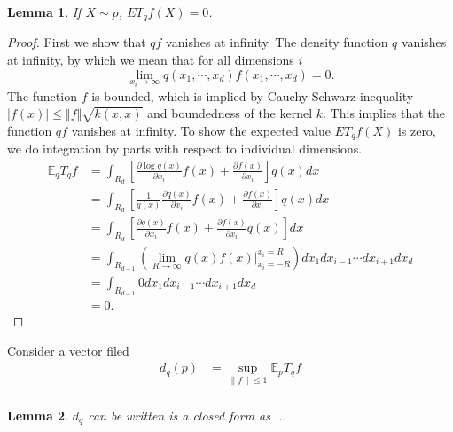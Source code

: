\documentclass{article}
\newtheorem{lemma}{Lemma}
\begin{document}
\begin{lemma}
If $X \sim p$, $ E T_{q}f(X) =0$.
\end{lemma}
\begin{proof}
First we show that $qf$ vanishes at infinity. The density function $q$ vanishes at infinity, by which we mean that for all dimensions $i$
\[
 \lim_{x_i \to \infty} q(x_1,\cdots,x_d)f(x_1,\cdots,x_d)=0.
\]
The function $f$ is bounded, which is implied by  Cauchy-Schwarz inequality  $\left|f(x)\right|\le\left\Vert f\right\Vert \sqrt{k(x,x)}$ and boundedness of the kernel $k$. This implies that the function $qf$ vanishes at infinity. To show the expected value $E T_{q}f(X)$ is zero,  we do integration by parts with respect to individual dimensions.
\begin{align*}
\mathbb{E}_{q}T_{q}f & =\int_{R_d} \left[ \frac{\partial \log q(x)}{ \partial x_i} f(x)+\frac{\partial f(x)}{ \partial x_i} \right]q(x)dx\\
 & =\int_{R_d} \left[\frac{1}{q(x)}\frac{\partial q(x)}{ \partial x_i}f(x)  +\frac{\partial f(x)}{ \partial x_i} \right]q(x)dx\\
 & =\int_{R_d} \left[\frac{\partial q(x)}{ \partial x_i} f(x)+\frac{\partial  f(x)}{ \partial x_i}q(x)\right]dx\\
 & = \int_{R_{d-1}} \left( \lim_{R \to \infty} q(x)f(x) \bigg|_{x_i=-R}^{x_i=R} \right) dx_1 dx_{i-1} \cdots dx_{i+1} d{x_d} \\
 & = \int_{R_{d-1}} 0 dx_1 dx_{i-1} \cdots dx_{i+1} d{x_d} \\
 & =0.
\end{align*}

\end{proof}
Consider a vector filed 
\begin{align}
d_{q}(p) & =\sup_{\|f\|\le1}\mathbb{E}_{p}T_{q}f\\
\end{align}
\begin{lemma}
 $d_{q}$ can be written is a closed form as ...


\end{lemma}
\end{document}
